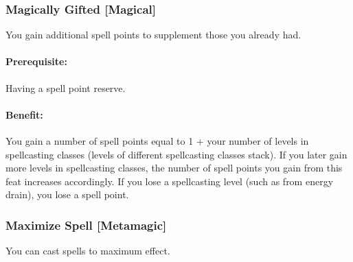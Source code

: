 \subsubsection[Magically Gifted]{Magically Gifted [Magical]}
\label{Feat:MagicallyGifted}
You gain additional spell points to supplement those you already had.

\paragraph{Prerequisite:} Having a spell point reserve.

\paragraph{Benefit:} You gain a number of spell points equal to 1 + your number of levels in spellcasting classes (levels of different spellcasting classes stack). If you later gain more levels in spellcasting classes, the number of spell points you gain from this feat increases accordingly. If you lose a spellcasting level (such as from energy drain), you lose a spell point.

\subsubsection[Maximize Spell]{Maximize Spell [Metamagic]}
\label{Feat:MaximizeSpell}
You can cast spells to maximum effect.

